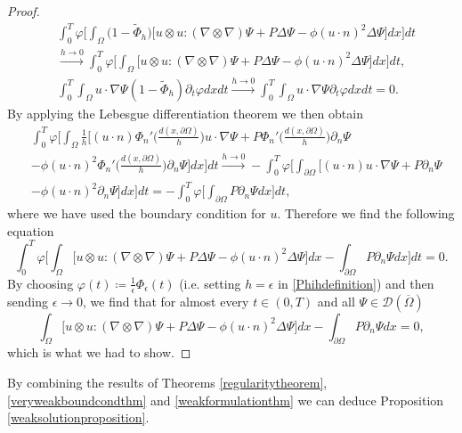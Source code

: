 \documentclass[12pt,a4paper]{article}
\theoremstyle{definition}
\theoremstyle{remark}
\numberwithin{equation}{section}
\begin{document}
\begin{proof}
\begin{align*}
&\int_0^T \varphi \bigg[ \int_\Omega \big( 1 - \widetilde{\Phi}_h) \bigg[ u \otimes u : (\nabla \otimes \nabla) \Psi + P \Delta \Psi - \phi (u \cdot n)^2 \Delta \Psi \bigg] dx \bigg] dt \\
&\xrightarrow[]{h \rightarrow 0} \int_0^T \varphi \bigg[ \int_\Omega \bigg[ u \otimes u : (\nabla \otimes \nabla) \Psi + P \Delta \Psi - \phi (u \cdot n)^2 \Delta \Psi \bigg] dx \bigg] dt, \\
&\int_0^T \int_\Omega u \cdot \nabla \Psi (1 - \widetilde{\Phi}_h) \partial_t \varphi dx dt \xrightarrow[]{h \rightarrow 0} \int_0^T \int_\Omega u \cdot \nabla \Psi \partial_t \varphi dx dt = 0.
\end{align*}
By applying the Lebesgue differentiation theorem we then obtain
\begin{align*}
&\int_0^T \varphi \bigg[ \int_\Omega \frac{1}{h} \bigg[ (u \cdot n)  \Phi_n' \bigg( \frac{d(x,\partial \Omega)}{h} \bigg) u \cdot \nabla \Psi + P \Phi_n' \bigg( \frac{d(x,\partial \Omega)}{h} \bigg) \partial_n \Psi \\
&- \phi (u \cdot n)^2 \Phi_n' \bigg( \frac{d(x,\partial \Omega)}{h} \bigg) \partial_n \Psi \bigg] dx \bigg] dt \xrightarrow[]{h \rightarrow 0} - \int_0^T \varphi \bigg[ \int_{\partial \Omega} \bigg[ (u \cdot n)  u \cdot \nabla \Psi + P \partial_n \Psi \\
&- \phi (u \cdot n)^2 \partial_n \Psi \bigg] dx \bigg] dt = -\int_0^T \varphi \bigg[ \int_{\partial \Omega} P \partial_n \Psi dx \bigg] dt,
\end{align*}
where we have used the boundary condition for $u$. Therefore we find the following equation
\begin{equation*}
\int_0^T \varphi \bigg[ \int_\Omega \bigg[ u \otimes u : (\nabla \otimes \nabla) \Psi + P \Delta \Psi - \phi (u \cdot n)^2 \Delta \Psi \bigg] dx - \int_{\partial \Omega} P \partial_n \Psi dx \bigg] dt = 0.
\end{equation*}
By choosing $\varphi (t) \coloneqq \frac{1}{\epsilon} \Phi_\epsilon (t)$ (i.e. setting $h = \epsilon$ in \eqref{Phihdefinition}) and then sending $\epsilon \rightarrow 0$, we find that for almost every $t \in (0,T)$ and all $\Psi \in \mathcal{D} (\overline{\Omega})$
\begin{equation*}
\int_\Omega \bigg[ u \otimes u : (\nabla \otimes \nabla) \Psi + P \Delta \Psi - \phi (u \cdot n)^2 \Delta \Psi \bigg] dx - \int_{\partial \Omega} P \partial_n \Psi dx = 0,
\end{equation*}
which is what we had to show.
\end{proof}
By combining the results of Theorems \ref{regularitytheorem}, \ref{veryweakboundcondthm} and \ref{weakformulationthm} we can deduce Proposition \ref{weaksolutionproposition}.
\end{document}
